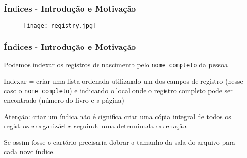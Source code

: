 \documentclass[t, 10pt, aspectratio=169, table, x11names]{beamer}
\begin{document}
	\begin{frame}
		\frametitle{Índices - Introdução e Motivação}
		\bigskip
		\begin{figure}[h]
			\centering
			\texttt{[image: registry.jpg]}
		\end{figure}
	\end{frame}

	\begin{frame}
		\frametitle{Índices - Introdução e Motivação}
		Podemos indexar os registros de nascimento pelo \texttt{nome completo} da pessoa
		\bigskip
		
		Indexar = criar uma lista ordenada utilizando um dos campos de registro (nesse caso o \texttt{nome completo}) e indicando o local onde o registro completo pode ser encontrado (número do livro e a página)
		\bigskip
		
		Atenção: criar um índica não é significa criar uma cópia integral de todos os registros e organizá-los seguindo uma determinada ordenação.
		\bigskip
		
		Se assim fosse o cartório precisaria dobrar o tamanho da sala do arquivo para cada novo índice. 

	\end{frame}
\end{document}
